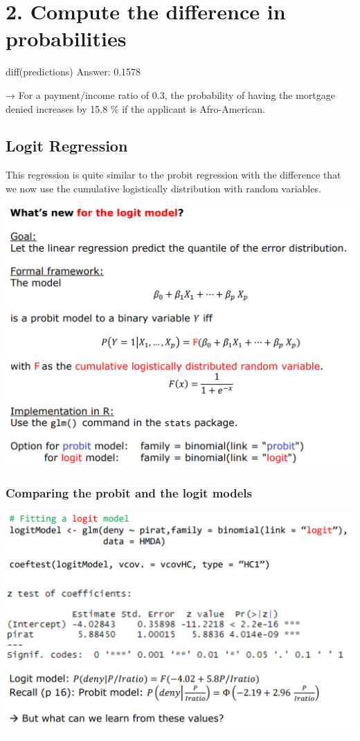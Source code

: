 \documentclass[
]{article}
\begin{document}
\hypertarget{compute-the-difference-in-probabilities}{%
\section{2. Compute the difference in
probabilities}\label{compute-the-difference-in-probabilities}}

diff(predictions) Answer: 0.1578

→ For a payment/income ratio of 0.3, the probability of having the
mortgage denied increases by 15.8 \% if the applicant is Afro-American.

\hypertarget{logit-regression}{%
\subsection{Logit Regression}\label{logit-regression}}

This regression is quite similar to the probit regression with the
difference that we now use the cumulative logistically distribution with
random variables.

\includegraphics[width=1\linewidth]{logit}

\hypertarget{comparing-the-probit-and-the-logit-models}{%
\subsubsection{Comparing the probit and the logit
models}\label{comparing-the-probit-and-the-logit-models}}

\includegraphics[width=1\linewidth]{comparison}
\end{document}
